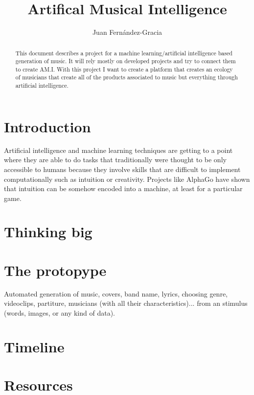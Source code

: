 \documentclass[a4paper,10pt]{article}
\title{\color{astral}A\color{black}rtifical \color{astral}M\color{black}usical \color{astral}I\color{black}ntelligence}
\author{Juan Fernández-Gracia}
\begin{document}
\maketitle

\begin{abstract}
This document describes a project for a machine learning/artificial intelligence based generation of music. It will rely mostly on developed projects and try to connect them to create \color{astral}AM.I.\color{black} With this project I want to create a platform that creates an ecology of musicians that create all of the products associated to music but everything through artificial intelligence.
\end{abstract}

\section{Introduction}

Artificial intelligence and machine learning techniques are getting to a point where they are able to do tasks that traditionally were thought to be only accessible to humans because they involve skills that are difficult to implement computationally such as intuition or creativity. Projects like AlphaGo have shown that intuition can be somehow encoded into a machine, at least for a particular game. 

\section{Thinking big}



\section{The protopype}

Automated generation of music, covers, band name, lyrics, choosing genre, videoclips, partiture, musicians (with all their characteristics)... from an stimulus (words, images, or any kind of data).

\section{Timeline}

\section{Resources}
\end{document}
